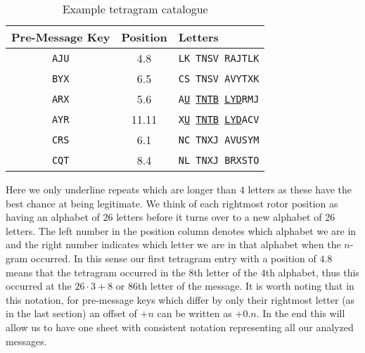   \begin{table}[h!]
    \centering
    \begin{tabular}{|c|c|l|}
      \hline
      \textbf{Pre-Message Key} & \textbf{Position} & \textbf{Letters}
      \\
      \hline
      \texttt{AJU}             & 4.8               & \texttt{LK TNSV
      RAJTLK}
      \\
      \texttt{BYX}             & 6.5               & \texttt{CS TNSV
      AVYTXK}
      \\
      \texttt{ARX}             & 5.6               &
      \texttt{A}{\uline{\texttt{U}}}\texttt{
      }{\uline{\texttt{T}}}\texttt{}{\uline{\texttt{N}}}\texttt{}{\uline{\texttt{T}}}\texttt{}{\uline{\texttt{B}}}\texttt{
      }{\uline{\texttt{L}}}\texttt{}{\uline{\texttt{Y}}}\texttt{}{\uline{\texttt{D}}}\texttt{RMJ}
      \\
      \texttt{AYR}             & 11.11             &
      \texttt{X}{\uline{\texttt{U}}}\texttt{
      }{\uline{\texttt{T}}}\texttt{}{\uline{\texttt{N}}}\texttt{}{\uline{\texttt{T}}}\texttt{}{\uline{\texttt{B}}}\texttt{
      }{\uline{\texttt{L}}}\texttt{}{\uline{\texttt{Y}}}\texttt{}{\uline{\texttt{D}}}\texttt{ACV}
      \\
      \texttt{CRS}             & 6.1               & \texttt{NC TNXJ
      AVUSYM}
      \\
      \texttt{CQT}             & 8.4               &
      \texttt{}{\texttt{N}}\texttt{L TNXJ BRXSTO}
      \\
      \hline
    \end{tabular}
    \caption{Example tetragram catalogue}
  \end{table}
  \noindent Here we only underline repeats which are longer than $4$
  letters as these have the best chance at being legitimate. We think
  of each rightmost rotor position as having an alphabet of 26
  letters before it turns over to a new alphabet of 26 letters. The
  left number in the position column denotes which alphabet we are in and
  the right number indicates which letter we are in that alphabet
  when the $n$-gram occurred. In this sense our first tetragram entry
  with a position of $4.8$ means that the tetragram occurred in the
  $8$th letter of the $4$th alphabet, thus this occurred at the
  $26\cdot3 + 8$ or $86$th letter of the message. It is worth noting
  that in this notation, for pre-message keys which differ by only
  their rightmost letter (as in the last section) an offset of $+n$
  can be written as $+0.n$. In the end this will allow us to have one
  sheet with consistent notation representing all our analyzed messages.

